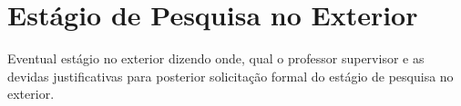 \documentclass[12pt,a4paper]{article}
\begin{document}
\section{Estágio de Pesquisa no Exterior}
\label{sec:pesquisa-exterior}
Eventual estágio no exterior dizendo onde, qual o professor supervisor e as devidas justificativas para posterior solicitação formal do estágio de pesquisa no exterior.





\listoftodos
\end{document}

